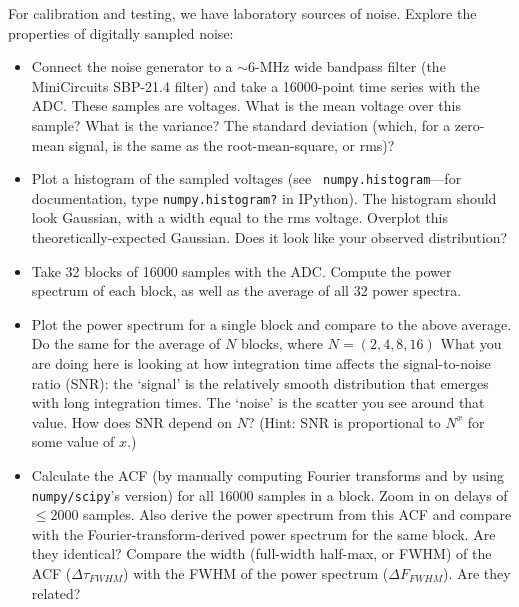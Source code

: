 \documentclass[11pt,preprint]{aastex}
\begin{document}
For calibration and testing, we have laboratory sources of noise. Explore
the properties of digitally sampled noise:

\begin{itemize}

\item Connect the noise generator to a $\sim 6$-MHz wide bandpass
  filter (the MiniCircuits SBP-21.4 filter) and take a 16000-point time
  series with the ADC. These samples are voltages. What is the
  mean voltage over this sample?
  What is the variance? The standard deviation (which, for a zero-mean signal,
  is the same as the root-mean-square, or rms)?

\item Plot a histogram of the sampled voltages (see {\tt
  numpy.histogram}---for documentation, type {\tt numpy.histogram?} in IPython).
  The histogram
  should look Gaussian, with a width equal to the rms
  voltage. Overplot this theoretically-expected Gaussian. Does it look
  like your observed distribution?

\item Take 32 blocks of 16000 samples with the ADC. Compute the power spectrum
  of each block, as well as the average of all 32 power
  spectra.

\item Plot the power spectrum for a single block and compare to the
  above average. Do the same for the average of $N$ blocks, where $N=(2,
  4, 8, 16)$ What you are doing here is looking at how integration time
  affects the signal-to-noise ratio (SNR): the `signal' is the relatively
  smooth distribution that emerges with long integration times.
  The `noise' is the scatter you see around that value. How does
  SNR depend on $N$? (Hint: SNR is proportional to $N^x$ for some value of $x$.)

\item Calculate the ACF (by manually computing Fourier transforms and by using \verb$numpy/scipy$'s version)
  for all
  16000 samples in a block. Zoom in on delays of $\le 2000$ samples. Also derive the power
  spectrum from this ACF and compare with the Fourier-transform-derived power
  spectrum for the same block.  Are they identical?
  Compare the width (full-width half-max, or FWHM) of the ACF ($\Delta
  \tau_{FWHM}$) with the FWHM of the power spectrum ($\Delta
  F_{FWHM}$). Are they related?

\end{itemize}

\end{document}
